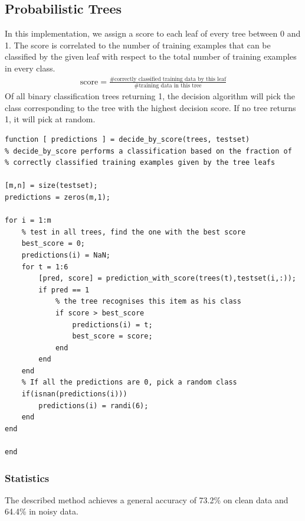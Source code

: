 \documentclass{article}
\begin{document}
\subsection{Probabilistic Trees}
In this implementation, we assign a score to each leaf of every tree between 0 and 1. The score is correlated to the number of training examples that can be classified by the given leaf with respect to the total number of training examples in every class.
\begin{align*}
    \textrm{score} = \frac{\textrm{\# correctly classified training data by this leaf}}{\textrm{\# training data in this tree}}
\end{align*}
Of all binary classification trees returning 1, the decision algorithm will pick the class corresponding to the tree with the highest decision score. If no tree returns 1, it will pick at random.
\begin{lstlisting}
function [ predictions ] = decide_by_score(trees, testset)
% decide_by_score performs a classification based on the fraction of
% correctly classified training examples given by the tree leafs

[m,n] = size(testset);
predictions = zeros(m,1);

for i = 1:m
    % test in all trees, find the one with the best score
    best_score = 0;
    predictions(i) = NaN;
    for t = 1:6
        [pred, score] = prediction_with_score(trees(t),testset(i,:));
        if pred == 1
            % the tree recognises this item as his class
            if score > best_score
                predictions(i) = t;
                best_score = score;
            end
        end
    end
    % If all the predictions are 0, pick a random class
    if(isnan(predictions(i)))
        predictions(i) = randi(6);
    end
end

end
\end{lstlisting}


\subsubsection{Statistics}
The described method achieves a general accuracy of 73.2\% on clean data and 64.4\% in noisy data.
\end{document}
